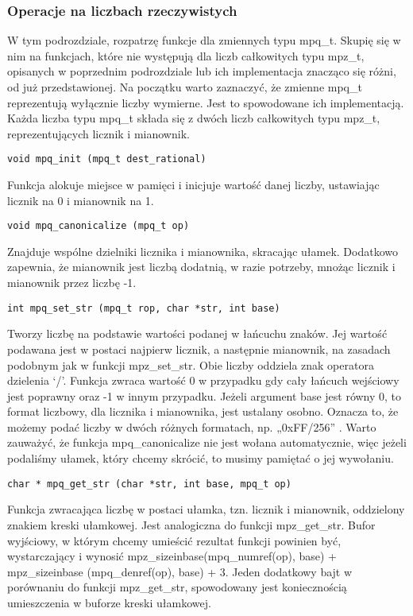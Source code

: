 \documentclass[twoside,a4paper]{book}
\begin{document}
\subsubsection{Operacje na liczbach rzeczywistych}
W tym podrozdziale, rozpatrzę funkcje dla zmiennych typu mpq\_t. Skupię się w nim na funkcjach, które nie występują dla liczb całkowitych typu mpz\_t, opisanych w poprzednim podrozdziale lub ich implementacja znacząco się różni, od już przedstawionej.
Na początku warto zaznaczyć, że zmienne mpq\_t reprezentują wyłącznie liczby wymierne. Jest to spowodowane ich implementacją. Każda liczba typu mpq\_t składa się z dwóch liczb całkowitych typu mpz\_t, reprezentujących licznik i mianownik.

\begin{lstlisting}
void mpq_init (mpq_t dest_rational)
\end{lstlisting}
Funkcja alokuje miejsce w pamięci i inicjuje wartość danej liczby, ustawiając licznik na 0 i mianownik na 1.

\begin{lstlisting}
void mpq_canonicalize (mpq_t op)
\end{lstlisting}
Znajduje wspólne dzielniki licznika i mianownika, skracając ułamek. Dodatkowo zapewnia, że mianownik jest liczbą dodatnią, w razie potrzeby, mnożąc licznik i mianownik przez liczbę -1.

\begin{lstlisting}
int mpq_set_str (mpq_t rop, char *str, int base)
\end{lstlisting}
Tworzy liczbę na podstawie wartości podanej w łańcuchu znaków. Jej wartość podawana jest w postaci najpierw licznik, a następnie mianownik, na zasadach podobnym jak w funkcji mpz\_set\_str. Obie liczby oddziela znak operatora dzielenia ‘/’. Funkcja zwraca wartość 0 w przypadku gdy cały łańcuch wejściowy jest poprawny oraz -1 w innym przypadku. Jeżeli argument base jest równy 0, to format liczbowy, dla licznika i mianownika, jest ustalany osobno. Oznacza to, że możemy podać liczby w dwóch różnych formatach, np. „0xFF/256” . Warto zauważyć, że funkcja mpq\_canonicalize nie jest wołana automatycznie, więc jeżeli podaliśmy ułamek, który chcemy skrócić, to musimy pamiętać o jej wywołaniu.

\begin{lstlisting}
char * mpq_get_str (char *str, int base, mpq_t op)
\end{lstlisting}
Funkcja zwracająca liczbę w postaci ułamka, tzn. licznik i mianownik, oddzielony znakiem kreski ułamkowej. Jest analogiczna do funkcji mpz\_get\_str. Bufor wyjściowy, w którym chcemy umieścić rezultat funkcji powinien być, wystarczający i wynosić mpz\_sizeinbase(mpq\_numref(op), base) + mpz\_sizeinbase (mpq\_denref(op), base) + 3. Jeden dodatkowy bajt w porównaniu do funkcji mpz\_get\_str, spowodowany jest koniecznością umieszczenia w buforze kreski ułamkowej.
\end{document}
